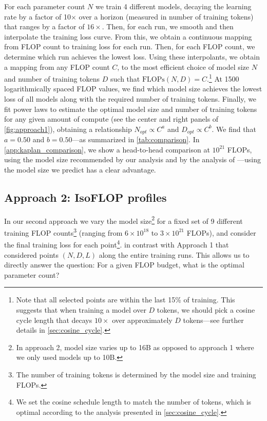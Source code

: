 For each parameter count $N$ we train 4 different models, decaying the learning rate by a factor of 10$\times$ over a horizon (measured in number of training tokens) that ranges by a factor of $16 \times$.
Then, for each run, we smooth and then interpolate the training loss curve. From this, we obtain a continuous mapping from FLOP count to training loss for each run. Then, for each FLOP count, we determine which run achieves the lowest loss. Using these interpolants, we obtain a mapping from any FLOP count $C$, to the most efficient choice of model size $N$ and number of training tokens $D$ such that $\text{FLOPs}(N,D) = C$.\footnote{Note that all selected points are within the last 15\% of training. This suggests that when training a model over $D$ tokens, we should pick a cosine cycle length that decays $10 \times$ over approximately $D$ tokens---see further details in \autoref{sec:cosine_cycle}.}
At 1500 logarithmically spaced FLOP values, we find which model size achieves the lowest loss of all models along with the required number of training tokens. Finally, we fit power laws to estimate the optimal model size and number of training tokens for any given amount of compute (see the center and right panels of \autoref{fig:approach1}), obtaining a relationship $N_{opt} \propto C^a$ and $D_{opt} \propto C^b$. We find that $a=0.50$ and $b=0.50$---as summarized in \autoref{tab:comparison}.
In \autoref{app:kaplan_comparison}, we show a head-to-head comparison at $10^{21}$ FLOPs, using the model size recommended by our analysis and by the analysis of \citet{kaplan2020scaling}---using the model size we predict has a clear advantage.

\subsection{Approach 2: IsoFLOP profiles} In our second approach we vary the model size\footnote{In approach 2, model size varies up to 16B as opposed to approach 1 where we only used models up to 10B.} for a fixed set of 9 different training FLOP counts\footnote{The number of training tokens is determined by the model size and training FLOPs.} (ranging from $6 \times10^{18}$ to  $3 \times 10^{21}$ FLOPs), and consider the final training loss for each point\footnote{We set the cosine schedule length to match the number of tokens, which is optimal according to the analysis presented in \autoref{sec:cosine_cycle}.}. in contrast with Approach 1 that considered points $(N, D, L)$ along the entire training runs. This allows us to directly answer the question: For a given FLOP budget, what is the optimal parameter count?

